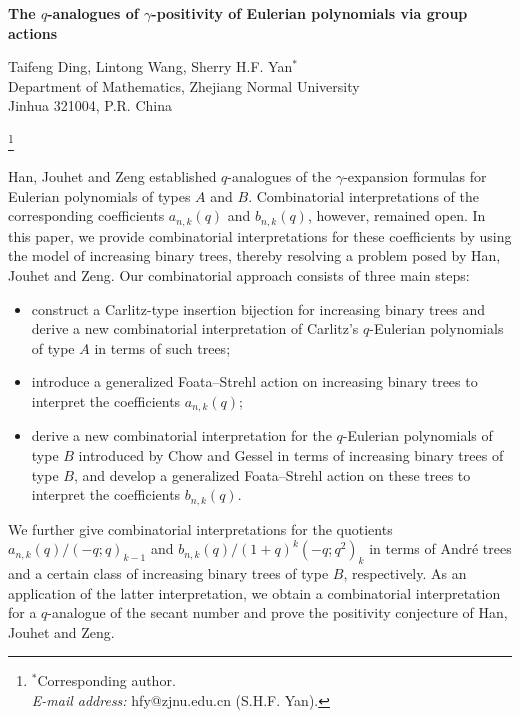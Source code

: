 \documentclass[12pt]{article}
\numberwithin{equation}{section}
\theoremstyle{plain}
\begin{document}
	\begin{center}
		{\Large\bf   The $q$-analogues of $\gamma$-positivity of Eulerian polynomials via group actions}
	\end{center}
	
	\begin{center}
		{\small  Taifeng Ding,   Lintong Wang,   Sherry H.F. Yan$^*$}\\[4pt]
		 
	 Department of Mathematics, Zhejiang Normal University\\
		Jinhua 321004, P.R. China
	\end{center}
	\footnote{$^*$Corresponding author. \\{\em E-mail address:}   hfy@zjnu.edu.cn (S.H.F. Yan).}
	
	\vskip0.1in
	 	Han, Jouhet and Zeng established $q$-analogues of the 
	 $\gamma$-expansion formulas for Eulerian polynomials of types $A$ and $B$.
	 Combinatorial interpretations of the corresponding coefficients
	 $a_{n,k}(q)$ and $b_{n,k}(q)$, however, remained open.
	 In this paper, we provide combinatorial interpretations for these
	 coefficients by using the model of increasing binary trees, thereby
	 resolving a problem posed by Han, Jouhet and Zeng.
	 Our combinatorial approach consists of three main steps:
	 
	 \begin{itemize}
	 	\item construct a Carlitz-type insertion bijection for increasing
	 	binary trees and derive a new combinatorial interpretation of
	 	Carlitz's $q$-Eulerian polynomials of type $A$ in terms of such trees;
	 	
	 	\item introduce a generalized Foata--Strehl action on increasing
	 	binary trees to interpret the coefficients $a_{n,k}(q)$;
	 	
	 	\item derive a new combinatorial interpretation for the $q$-Eulerian
	 	polynomials of type $B$ introduced by Chow and Gessel in terms of
	 	increasing binary trees of type $B$, and develop a generalized
	 	Foata--Strehl action on these trees to interpret the coefficients
	 	$b_{n,k}(q)$.
	 \end{itemize}
	 
	 We further give combinatorial interpretations for the quotients ${a_{n,k}(q)/(-q;q)_{k-1}}$ and 
	 ${b_{n,k}(q)/(1+q)^k(-q;q^2)_k}$ 
	 in terms of Andr\'e trees and a certain class of increasing
	 binary trees of type $B$, respectively. As an application of the latter
	 interpretation, we obtain a combinatorial  interpretation   for   a $q$-analogue of the secant number    and prove the positivity conjecture of Han, Jouhet and
	 Zeng.
	 
\end{document}
